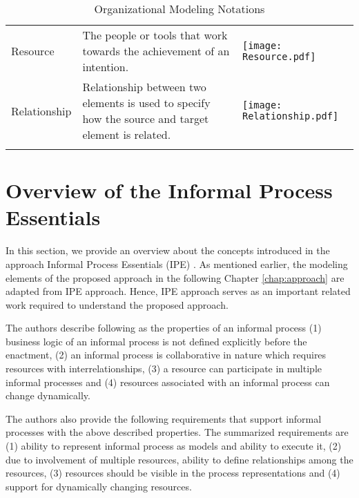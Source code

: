 \begin{center}
\begin{longtable}{p{3cm}p{10cm}p{3cm}}
		Resource					& The people or tools that work towards the achievement of an intention. & \begin{center} \texttt{[image: Resource.pdf]} \end{center}  \\
		
		Relationship				& Relationship between two elements is used to specify how the source and target element is related.  & \begin{center} \texttt{[image: Relationship.pdf]} \end{center}   \\
		
		\bottomrule
		\caption{Organizational Modeling Notations}
		\label{tab:notations}		
	\end{longtable}	
\end{center}

\section{Overview of the Informal Process Essentials}
\label{sec:basicconcepts}
In this section, we provide an overview about the concepts introduced in the approach Informal Process Essentials (IPE) \cite{Sungur2014a}. As mentioned earlier, the modeling elements of the proposed approach in the following Chapter \ref{chap:approach} are adapted from IPE approach. Hence, IPE approach serves as an important related work required to understand the proposed approach. 

The authors describe following as the properties of an informal process (1) business logic of an informal process is not defined explicitly before the enactment, (2) an informal process is collaborative in nature which requires resources with interrelationships, (3) a resource can participate in multiple informal processes and (4) resources associated with an informal process can change dynamically.

The authors also provide the following requirements that support informal processes with the above described properties. The summarized requirements are (1) ability to represent informal process as models and ability to execute it, (2) due to involvement of multiple resources, ability to define relationships among the resources, (3) resources should be visible in the process representations and (4) support for dynamically changing resources. 

